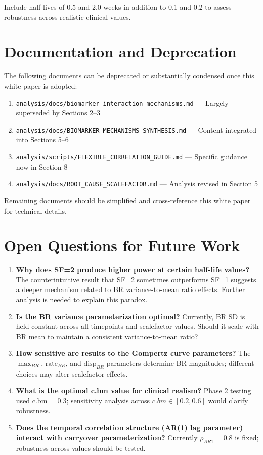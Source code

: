 \documentclass[12pt,a4paper]{article}
\begin{document}
Include half-lives of 0.5 and 2.0 weeks in addition to 0.1 and 0.2 to assess robustness across realistic clinical values.

\section{Documentation and Deprecation}

The following documents can be deprecated or substantially condensed once this white paper is adopted:

\begin{enumerate}
\item \texttt{analysis/docs/biomarker\_interaction\_mechanisms.md} --- Largely superseded by Sections 2--3
\item \texttt{analysis/docs/BIOMARKER\_MECHANISMS\_SYNTHESIS.md} --- Content integrated into Sections 5--6
\item \texttt{analysis/scripts/FLEXIBLE\_CORRELATION\_GUIDE.md} --- Specific guidance now in Section 8
\item \texttt{analysis/docs/ROOT\_CAUSE\_SCALEFACTOR.md} --- Analysis revised in Section 5
\end{enumerate}

Remaining documents should be simplified and cross-reference this white paper for technical details.

\section{Open Questions for Future Work}

\begin{enumerate}
\item \textbf{Why does SF=2 produce higher power at certain half-life values?} The counterintuitive result that SF=2 sometimes outperforms SF=1 suggests a deeper mechanism related to BR variance-to-mean ratio effects. Further analysis is needed to explain this paradox.

\item \textbf{Is the BR variance parameterization optimal?} Currently, BR SD is held constant across all timepoints and scalefactor values. Should it scale with BR mean to maintain a consistent variance-to-mean ratio?

\item \textbf{How sensitive are results to the Gompertz curve parameters?} The $\max_{BR}$, $\text{rate}_{BR}$, and $\text{disp}_{BR}$ parameters determine BR magnitudes; different choices may alter scalefactor effects.

\item \textbf{What is the optimal c.bm value for clinical realism?} Phase 2 testing used c.bm = 0.3; sensitivity analysis across $c.bm \in [0.2, 0.6]$ would clarify robustness.

\item \textbf{Does the temporal correlation structure (AR(1) lag parameter) interact with carryover parameterization?} Currently $\rho_{AR1} = 0.8$ is fixed; robustness across values should be tested.
\end{enumerate}
\end{document}
